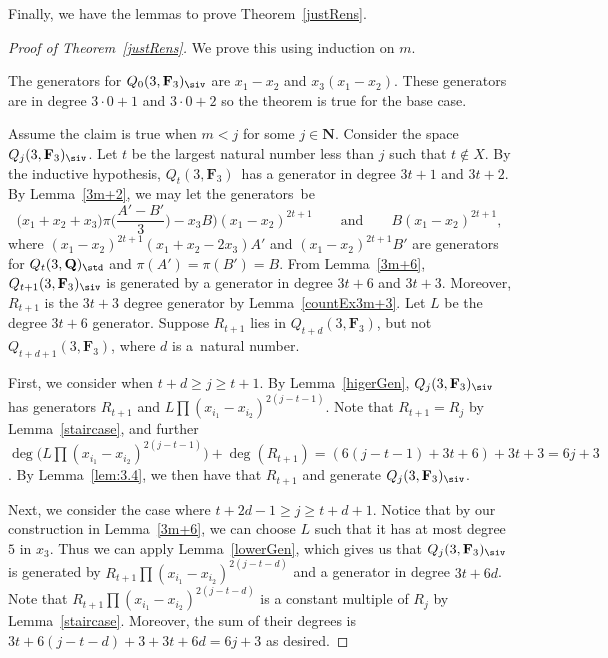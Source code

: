 Finally, we have the lemmas to prove Theorem~\ref{justRens}.

\begin{proof}[Proof of Theorem~\ref{justRens}]
 We prove this using induction on $m$.

 The generators for $Q_0(3,\mathbf{F}_3)_{\siv}$ are $x_1-x_2$ and $x_3(x_1-x_2)$. These generators are in degree $3\cdot 0 +1$ and $3\cdot 0 +2$ so the theorem is true for the base case.

 Assume the claim is true when $m<j$ for some $j\in \mathbf{N}$. Consider the space $Q_j(3,\mathbf{F}_3)_{\siv}$. Let $t$ be the largest natural number less than $j$ such that $t\not\in X$. By the inductive hypothesis, $Q_t(3,\mathbf{F}_3)$~has a generator in degree $3t+1$ and $3t+2$. By Lemma~\ref{3m+2}, we may let the generators~be
 \[\biggl(x_1+x_2+x_3)\pi\biggl(\frac{A'-B'}{3}\biggr)-x_3B\biggr)(x_1-x_2)^{2t+1}\qquad
 \text{and}\qquad
 B(x_1-x_2)^{2t+1},\]
 where $(x_1-x_2)^{2t+1}(x_1+x_2-2x_3)A'$ and $(x_1-x_2)^{2t+1}B'$ are generators for $Q_t(3,\mathbf{Q})_{\std}$ and $\pi(A')=\pi(B')=B$. From Lemma~\ref{3m+6}, $Q_{t+1}(3,\mathbf{F}_3)_{\siv}$ is generated by a generator in degree ${3t+6}$ and $3t+3$. Moreover, $R_{t+1}$ is the $3t+3$ degree generator by Lemma~\ref{countEx3m+3}. Let $L$ be the degree $3t+6$ generator. Suppose $R_{t+1}$ lies in $Q_{t+d}(3,\mathbf{F}_3)$, but not $Q_{t+d+1}(3,\mathbf{F}_3)$, where $d$ is a~natural number.

 First, we consider when $t+d\geq j\geq t+1$. By Lemma~\ref{higerGen}, $Q_j(3,\mathbf{F}_3)_{\siv}$ has generators $R_{t+1}$ and $L\prod (x_{i_1}-x_{i_2})^{2(j-t-1)}$. Note that $R_{t+1}=R_{j}$ by Lemma~\ref{staircase}, and further $\deg\big(L\prod (x_{i_1}-x_{i_2})^{2(j-t-1)}\big) + \deg(R_{t+1}) = (6(j-t-1) + 3t+6)+3t+3=6j+3$. By Lemma~\ref{lem:3.4}, we then have that $R_{t+1}$ and  generate $Q_j(3,\mathbf{F}_3)_{\siv}$.

 Next, we consider the case where $t+2d-1\geq j\geq t+d+1$. Notice that by our construction in Lemma~\ref{3m+6}, we can choose $L$ such that it has at most degree $5$ in $x_3$. Thus we can apply Lemma~\ref{lowerGen}, which gives us that $Q_j(3,\mathbf{F}_3)_{\siv}$ is generated by $R_{t+1}\prod (x_{i_1}-x_{i_2})^{2(j-t-d)}$ and a generator in degree $3t+6d$. Note that $R_{t+1}\prod (x_{i_1}-x_{i_2})^{2(j-t-d)}$ is a constant multiple of $R_j$ by Lemma~\ref{staircase}. Moreover, the sum of their degrees is $3t+6(j-t-d)+3+3t+6d=6j+3$ as desired.


\end{proof}
